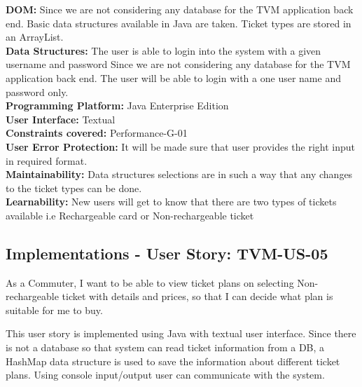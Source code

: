 \documentclass[a4paper,12pt]{report}
\begin{document}
\begin{flushleft}
	\vspace{0.5cm}
	\textbf{DOM:} Since we are not considering any database for the TVM application back end. Basic data structures available in Java are taken. Ticket types are stored in an ArrayList.\\
	
	\vspace{0.5cm}
	\textbf{Data Structures: }The user is able to login into the system with a given username and password  Since we are not considering any database for the TVM application back end. The user will be able to login with a one user name and password only.\\
	
	\vspace{0.5cm}
	\textbf{Programming Platform: } Java Enterprise Edition \\
	\textbf{User Interface:} Textual \\
	\textbf{Constraints covered:} Performance-G-01 \\
	
	\vspace{0.5cm}
	\textbf{User Error Protection:} It will be made sure that user provides the right input in required format. \\
	\textbf{Maintainability: } Data structures selections are in such a way that any changes to the ticket types can be done. \\
	\textbf{Learnability: } New users will get to know that there are two types of tickets available i.e Rechargeable card or Non-rechargeable ticket
	
\end{flushleft}






\FloatBarrier
\vspace{0.5cm}
\subsection{Implementations - User Story: TVM-US-05}
As a Commuter, I want to be able to view ticket plans on selecting Non-rechargeable ticket with details and prices, so that I can decide what plan is suitable for me to buy.

This user story is implemented using Java with textual user interface. Since there is not a database so that system can read ticket information from a DB, a HashMap data structure is used to save the information about different ticket plans. Using console input/output user can communicate with the system.
\end{document}
